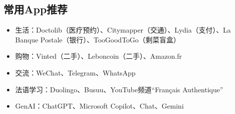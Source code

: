 \subsection{常用App推荐}

\begin{itemize}
    \item 生活：Doctolib（医疗预约）、Citymapper（交通）、Lydia（支付）、La Banque Postale（银行）、TooGoodToGo（剩菜盲盒）
    \item 购物：Vinted（二手）、Leboncoin（二手）、Amazon.fr
    \item 交流：WeChat、Telegram、WhatsApp
    \item 法语学习：Duolingo、Busuu、YouTube频道“Français Authentique”
    \item GenAI：ChatGPT、Microsoft Copilot、Chat、Gemini
\end{itemize}
